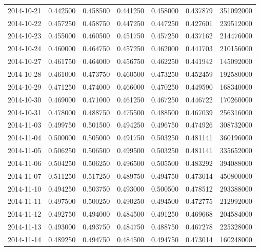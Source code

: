 \begin{tabular}{lrrrrrr}
2014-10-21 &    0.442500 &    0.458500 &    0.441250 &    0.458000 &    0.437879 &   351092000 \\
2014-10-22 &    0.457250 &    0.458750 &    0.447250 &    0.447250 &    0.427601 &   239512000 \\
2014-10-23 &    0.455000 &    0.460500 &    0.451750 &    0.457250 &    0.437162 &   214476000 \\
2014-10-24 &    0.460000 &    0.464750 &    0.457250 &    0.462000 &    0.441703 &   210156000 \\
2014-10-27 &    0.461750 &    0.464000 &    0.456750 &    0.462250 &    0.441942 &   145092000 \\
2014-10-28 &    0.461000 &    0.473750 &    0.460500 &    0.473250 &    0.452459 &   192580000 \\
2014-10-29 &    0.471250 &    0.474000 &    0.466000 &    0.470250 &    0.449590 &   168340000 \\
2014-10-30 &    0.469000 &    0.471000 &    0.461250 &    0.467250 &    0.446722 &   170260000 \\
2014-10-31 &    0.478000 &    0.488750 &    0.475500 &    0.488500 &    0.467039 &   256316000 \\
2014-11-03 &    0.499750 &    0.501500 &    0.494250 &    0.496750 &    0.474926 &   308732000 \\
2014-11-04 &    0.500000 &    0.505000 &    0.491750 &    0.503250 &    0.481141 &   360196000 \\
2014-11-05 &    0.506250 &    0.506500 &    0.499500 &    0.503250 &    0.481141 &   335652000 \\
2014-11-06 &    0.504250 &    0.506250 &    0.496500 &    0.505500 &    0.483292 &   394088000 \\
2014-11-07 &    0.511250 &    0.517250 &    0.489750 &    0.494750 &    0.473014 &   450800000 \\
2014-11-10 &    0.494250 &    0.503750 &    0.493000 &    0.500500 &    0.478512 &   293388000 \\
2014-11-11 &    0.497500 &    0.500250 &    0.490250 &    0.494500 &    0.472775 &   212992000 \\
2014-11-12 &    0.492750 &    0.494000 &    0.484500 &    0.491250 &    0.469668 &   204584000 \\
2014-11-13 &    0.493000 &    0.493750 &    0.484750 &    0.488750 &    0.467278 &   225328000 \\
2014-11-14 &    0.489250 &    0.494750 &    0.484500 &    0.494750 &    0.473014 &   160248000 \\

\end{tabular}
